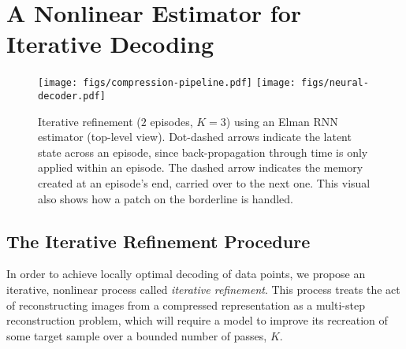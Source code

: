 \documentclass[smallabstract,smallcaptions]{dccpaper}
\begin{document}
\section{A Nonlinear Estimator for Iterative Decoding}
\label{iterative_refinement}

\begin{figure}[t]
\centering
\texttt{[image: figs/compression-pipeline.pdf]}
\texttt{[image: figs/neural-decoder.pdf]}
\caption{Iterative refinement ($2$ episodes, $K=3$) using an Elman RNN estimator (top-level view). 
Dot-dashed arrows indicate the latent state across an episode, since back-propagation through time is only applied within an episode. The dashed arrow indicates the memory created at an episode's end, carried over to the next one. This visual also shows how a patch on the borderline is handled.}
\label{fig:sysarch}
\end{figure}

\subsection{The Iterative Refinement Procedure}
\label{refinement}
In order to achieve locally optimal decoding of data points, we propose an iterative, nonlinear process called \emph{iterative refinement}. This process treats the act of reconstructing images from a compressed representation as a multi-step reconstruction problem, which will require a model to improve its recreation of some target sample over a bounded number of passes, $K$. 
\end{document}
